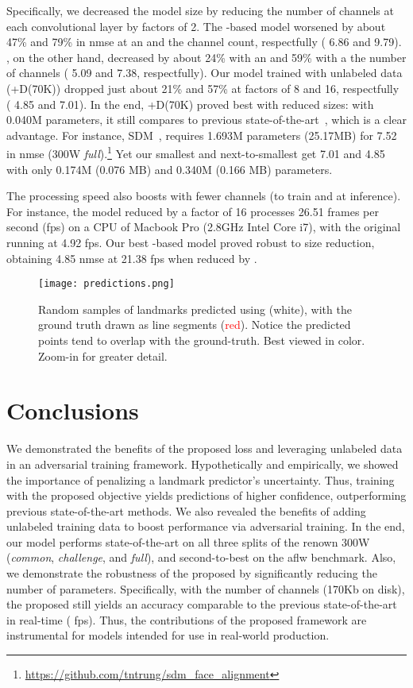 \documentclass[10pt,twocolumn,letterpaper]{article}
\begin{document}
Specifically, we decreased the model size by reducing the number of channels at each convolutional layer by factors of 2. The -based model worsened by about 47\% and 79\% in \gls{nmse} at an and the channel count, respectfully (  6.86 and 9.79). , on the other hand, decreased by about 24\% with an  and 59\% with a  the number of channels (  5.09 and 7.38, respectfully). Our model trained with unlabeled data (\ie +D(70K)) dropped just about 21\% and 57\% at factors of 8 and 16, respectfully (  4.85 and 7.01). In the end, +D(70K) proved best with reduced sizes: with 0.040M parameters, it still compares to previous state-of-the-art~\cite{honari2018improving,lv2017deep,wang2018recurrentpami}, which is a clear advantage. For instance, SDM~\cite{xiong2013supervised}, requires 1.693M parameters (25.17MB) for 7.52 in \gls{nmse} (300W \textit{full}).\footnote{\url{https://github.com/tntrung/sdm\_face\_alignment}} Yet our smallest and next-to-smallest get 7.01 and 4.85 with only 0.174M (0.076 MB) and 0.340M (0.166 MB) parameters.

The processing speed also boosts with fewer channels (\ie to train and at inference). For instance, the model reduced by a factor of 16 processes 26.51 frames per second (fps) on a CPU of Macbook Pro (\ie 2.8GHz Intel Core i7), with the original running at 4.92 fps. Our best -based model proved robust to size reduction, obtaining 4.85 \gls{nmse} at 21.38 fps when reduced by . 
 \begin{figure}[t!]
    \centering
    \texttt{[image: predictions.png]}
    \caption{Random samples of landmarks predicted using  (white), with the ground truth drawn as line segments (\textcolor{red}{red}). Notice the predicted points tend to overlap with the ground-truth. Best viewed in color. Zoom-in for greater detail.}
    \label{fig:faces}
     \vspace{-2mm}
\end{figure}
\section{Conclusions}
\label{sec:conclusion}
We demonstrated the benefits of the proposed  loss and leveraging unlabeled data in an adversarial training framework. Hypothetically and empirically, we showed the importance of penalizing a landmark predictor's uncertainty. Thus, training with the proposed objective yields predictions of higher confidence, outperforming previous state-of-the-art methods. We also revealed the benefits of adding unlabeled training data to boost performance via adversarial training. In the end, our model performs state-of-the-art on all three splits of the renown 300W (\ie \textit{common}, \textit{challenge}, and \textit{full}), and second-to-best on the \gls{aflw} benchmark. Also, we demonstrate the robustness of the proposed by significantly reducing the number of parameters. Specifically, with  the number of channels (\ie 170Kb on disk), the proposed still yields an accuracy comparable to the previous state-of-the-art in real-time ( fps). Thus, the contributions of the proposed framework are instrumental for models intended for use in real-world production.



{\small

\balance


}
\end{document}
